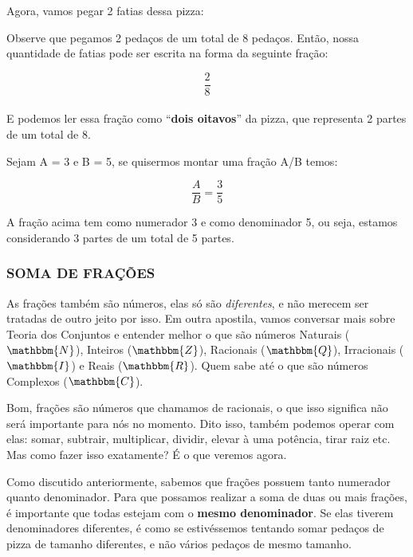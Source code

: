 Agora, vamos pegar 2 fatias dessa pizza:

\begin{figure}[H]
    \centering
    
\end{figure}

Observe que pegamos 2 pedaços de um total de 8 pedaços. Então, nossa quantidade de fatias pode ser escrita na forma da seguinte fração:

\begin{equation}
    \frac{2}{8}
\end{equation}\\

E podemos ler essa fração como ``\textbf{dois oitavos}'' da pizza, que representa 2 partes de um total de 8.\\

\begin{exemplo}
    Sejam A = 3 e B = 5, se quisermos montar uma fração A/B temos:

    \begin{equation}
        \frac{A}{B} = \frac{3}{5}
    \end{equation}

    A fração acima tem como numerador 3 e como denominador 5, ou seja, estamos considerando 3 partes de um total de 5 partes. 
\end{exemplo}


\subsubsection{SOMA DE FRAÇÕES}

As frações também são números, elas só são \textit{diferentes}, e não merecem ser tratadas de outro jeito por isso. Em outra apostila, vamos conversar mais sobre Teoria dos Conjuntos e entender melhor o que são números Naturais (\(\mathbbm{N}\)), Inteiros (\(\mathbbm{Z}\)), Racionais (\(\mathbbm{Q}\)), Irracionais (\(\mathbbm{I}\)) e Reais (\(\mathbbm{R}\)). Quem sabe até o que são números Complexos (\(\mathbbm{C}\)).

Bom, frações são números que chamamos de racionais, o que isso significa não será importante para nós no momento. Dito isso, também podemos operar com elas: somar, subtrair, multiplicar, dividir, elevar à uma potência, tirar raiz etc. Mas como fazer isso exatamente? É o que veremos agora.

Como discutido anteriormente, sabemos que frações possuem tanto numerador quanto denominador. Para que possamos realizar a soma de duas ou mais frações, é importante que todas estejam com o \textbf{mesmo denominador}. Se elas tiverem denominadores diferentes, é como se estivéssemos tentando somar pedaços de pizza de tamanho diferentes, e não vários pedaços de mesmo tamanho.

